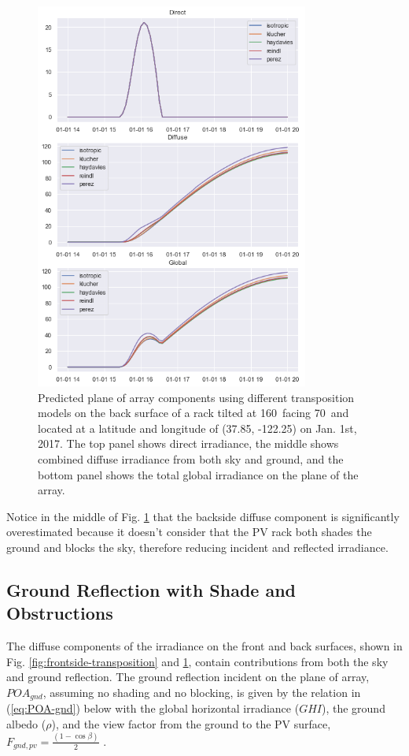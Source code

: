\documentclass[conference]{IEEEtran}
\begin{document}
\begin{figure}
\centering
\includegraphics[width=9cm]{backside_transposition.png}
\caption{Predicted plane of array components using different transposition models on the back surface of a rack tilted at 160\degree\ facing 70\degree\ and located at a latitude and longitude of (37.85\degree, -122.25\degree) on Jan. 1st, 2017.  The top panel shows direct irradiance, the middle shows combined diffuse irradiance from both sky and ground, and the bottom panel shows the total global irradiance on the plane of the array.}
\label{fig:backside-transposition}
\end{figure}

Notice in the middle of Fig. \ref{fig:backside-transposition} that the backside diffuse component is significantly overestimated because it doesn’t consider that the PV rack both shades the ground and blocks the sky, therefore reducing incident and reflected irradiance.

\subsection{ Ground Reflection with Shade and Obstructions}
The diffuse components of the irradiance on the front and back surfaces, shown in Fig. \ref{fig:frontside-transposition} and \ref{fig:backside-transposition}, contain contributions from both the sky and ground reflection.  The ground reflection incident on the plane of array, $POA_{gnd}$, assuming no shading and no blocking, is given by the relation in (\ref{eq:POA-gnd}) below with the global horizontal irradiance ($GHI$), the ground albedo ($\rho$), and the view factor from the ground to the PV surface, $F_{gnd,pv} = \frac{\left(1-\cos\beta\right)}{2}$ \cite{Marion2017}.
\end{document}
